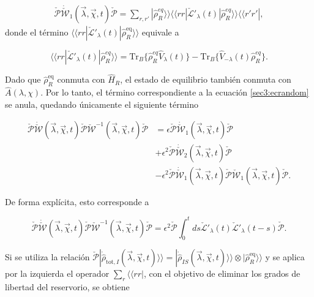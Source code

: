 \begin{appendixs}
\begin{align*}
    \check{\mathcal{P}}\dot{\check{\mathcal{W}}}_{1}(\vec{\lambda},\vec{\chi},t)\check{\mathcal{P}} = \sum_{r,r'}|\hat{\rho}^{eq}_{R} \rangle \rangle \langle \langle rr| \check{\mathcal{L}}'_{\lambda}(t)|\hat{\rho}_{R}^{eq}\rangle \rangle \langle \langle r'r'|,
\end{align*}
donde el término \(\langle\langle rr|\check{\mathcal{L}}'_{\lambda}(t)|\hat{\rho}_{R}^{\mathrm{eq}}\rangle\rangle\) equivale a

\begin{equation}
    \langle \langle rr|\check{\mathcal{L}}'_{\lambda}(t)|\hat{\rho}_{R}^{eq}\rangle \rangle  = \text{Tr}_{B}\{\hat{\rho}^{eq}_{R}\hat{V}_{\lambda}(t)\} - \text{Tr}_{B}\{\hat{V}_{-\lambda}(t)\hat{\rho}^{eq}_{R}\}.
    \label{sec3:ecrandom}
\end{equation}

Dado que \(\hat{\rho}_{R}^{\mathrm{eq}}\) conmuta con \(\hat{H}_{R}\), el estado de equilibrio también conmuta con \(\hat{A}(\lambda, \chi)\). Por lo tanto, el término correspondiente a la ecuación \ref{sec3:ecrandom} se anula, quedando únicamente el siguiente término

\begin{align*}
    \check{\mathcal{P}}\dot{\check{\mathcal{W}}}(\vec{\lambda},\vec{\chi},t)\check{\mathcal{P}}\check{\mathcal{W}}^{-1}(\vec{\lambda},\vec{\chi},t)\check{\mathcal{P}} & = \epsilon \check{\mathcal{P}}\dot{\check{\mathcal{W}}}_{1}(\vec{\lambda},\vec{\chi},t)\check{\mathcal{P}} \\
    & + \epsilon^{2}\check{\mathcal{P}}\dot{\check{\mathcal{W}}}_{2}(\vec{\lambda},\vec{\chi},t)\check{\mathcal{P}} \\
    & - \epsilon^{2}\check{\mathcal{P}}\dot{\check{\mathcal{W}}}_{1}(\vec{\lambda},\vec{\chi},t)\check{\mathcal{P}}  \check{\mathcal{W}}_{1}(\vec{\lambda},\vec{\chi},t) \check{\mathcal{P}}.
\end{align*}

De forma explícita, esto corresponde a 

\begin{equation*}
    \check{\mathcal{P}}\dot{\check{\mathcal{W}}}(\vec{\lambda},\vec{\chi},t)\check{\mathcal{P}}\check{\mathcal{W}}^{-1}(\vec{\lambda},\vec{\chi},t)\check{\mathcal{P}} = \epsilon^{2}\check{\mathcal{P}}\int_{0}^{t}ds \check{\mathcal{L}}'_{\lambda}(t)\check{\mathcal{L}}'_{\lambda}(t-s)\check{\mathcal{P}}. 
\end{equation*}

Si se utiliza la relación \(\check{\mathcal{P}}|\dot{\hat{\rho}}_{\mathrm{tot},I}(\vec{\lambda},\vec{\chi},t)\rangle\rangle = |\dot{\hat{\rho}}_{IS}(\vec{\lambda},\vec{\chi},t)\rangle\rangle \otimes |\hat{\rho}_{R}^{\mathrm{eq}}\rangle\rangle\) y se aplica por la izquierda el operador \(\sum_{r} \langle\langle rr|\), con el objetivo de eliminar los grados de libertad del reservorio, se obtiene


\end{appendixs}

